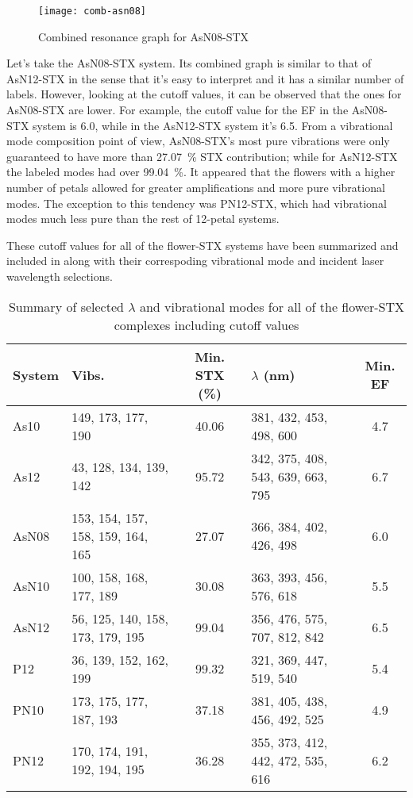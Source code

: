 \begin{figure}
    \texttt{[image: comb-asn08]}
    \caption[Combined resonance graph for AsN08-STX]{Combined resonance graph for AsN08-STX}
\end{figure}

Let's take the AsN08-STX system.
Its combined graph is similar to that of AsN12-STX in the sense that it's easy to interpret and it has a similar number of labels.
However, looking at the cutoff values, it can be observed that the ones for AsN08-STX are lower.
For example, the cutoff value for the EF in the AsN08-STX system is \num{6.0}, while in the AsN12-STX system it's \num{6.5}.
From a vibrational mode composition point of view, AsN08-STX's most pure vibrations were only guaranteed to have more than \SI{27.07}{\percent} STX contribution; while for AsN12-STX the labeled modes had over \SI{99.04}{\percent}.
It appeared that the flowers with a higher number of petals allowed for greater amplifications and more pure vibrational modes.
The exception to this tendency was PN12-STX, which had vibrational modes much less pure than the rest of 12-petal systems.

These cutoff values for all of the flower-STX systems have been summarized and included in  along with their correspoding vibrational mode and incident laser wavelength selections.

\begin{table*}
    \centering
    \caption[Summary of selected $\lambda$ and vibrational modes]{Summary of selected $\lambda$ and vibrational modes for all of the flower-STX complexes including cutoff values}
    \begin{tabular}{@{}llclc@{}}
        \toprule
        System & Vibs. & Min. STX (\si{\percent}) & $\lambda$ (\si{\nano\metre}) & Min. EF \\
        \midrule
        As10 & 149, 173, 177, 190 & 40.06 & 381, 432, 453, 498, 600 & 4.7 \\
        As12 & 43, 128, 134, 139, 142 & 95.72 & 342, 375, 408, 543, 639, 663, 795 & 6.7 \\
        AsN08 & 153, 154, 157, 158, 159, 164, 165 & 27.07 & 366, 384, 402, 426, 498 & 6.0 \\
        AsN10 & 100, 158, 168, 177, 189 & 30.08 & 363, 393, 456, 576, 618 & 5.5 \\
        AsN12 & 56, 125, 140, 158, 173, 179, 195 & 99.04 & 356, 476, 575, 707, 812, 842 & 6.5 \\
        P12 & 36, 139, 152, 162, 199 & 99.32 & 321, 369, 447, 519, 540 & 5.4 \\
        PN10 & 173, 175, 177, 187, 193 & 37.18 & 381, 405, 438, 456, 492, 525 & 4.9 \\
        PN12 & 170, 174, 191, 192, 194, 195 & 36.28 & 355, 373, 412, 442, 472, 535, 616 & 6.2 \\
        \bottomrule
    \end{tabular}
\end{table*}

